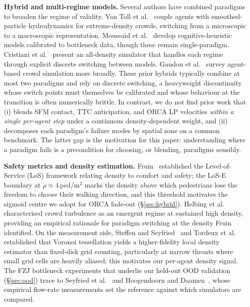 \documentclass[a4paper,twoside]{article}
\begin{document}
\textbf{Hybrid and multi-regime models.}
Several authors have combined paradigms to broaden the regime of validity. Van Toll et al.~\cite{VanToll21} couple agents with smoothed-particle hydrodynamics for extreme-density crowds, switching from a microscopic to a macroscopic representation. Moussa\"{\i}d et al.~\cite{Moussaid11} develop cognitive-heuristic models calibrated to bottleneck data, though these remain single-paradigm. Cristiani et al.~\cite{Cristiani23} present an all-density simulator that handles each regime through explicit discrete switching between models. Gaudou et al.~\cite{Gaudou24} survey agent-based crowd simulation more broadly. These prior hybrids typically combine at most two paradigms and rely on discrete switching, a heavyweight discontinuity whose switch points must themselves be calibrated and whose behaviour at the transition is often numerically brittle. In contrast, we do not find prior work that (i) blends SFM contact, TTC anticipation, and ORCA LP velocities \emph{within a single per-agent step} under a continuous density-dependent weight, and (ii) decomposes each paradigm's failure modes by spatial zone on a common benchmark. The latter gap is the motivation for this paper: understanding where a paradigm fails is a precondition for choosing, or blending, paradigms sensibly.

\textbf{Safety metrics and density estimation.}
Fruin~\cite{Fruin71} established the Level-of-Service (LoS) framework relating density to comfort and safety; the LoS-E boundary at $\rho\!\approx\!4$\,ped/m$^2$ marks the density above which pedestrians lose the freedom to choose their walking direction, and this threshold motivates the sigmoid centre we adopt for ORCA fade-out (\S\ref{sec:hybrid}). Helbing et al.~\cite{Helbing07} characterised crowd turbulence as an emergent regime at sustained high density, providing an empirical rationale for paradigm switching at the density Fruin identified. On the measurement side, Steffen and Seyfried~\cite{Steffen10} and Tordeux et al.~\cite{Tordeux15} established that Voronoi tessellation yields a higher-fidelity local density estimator than fixed-disk grid counting, particularly at narrow throats where small grid cells are heavily aliased; this motivates our per-agent density signal. The FZJ bottleneck experiments that underlie our held-out OOD validation (\S\ref{sec:ood}) trace to Seyfried et al.~\cite{Seyfried09} and Hoogendoorn and Daamen~\cite{Hoogendoorn05}, whose empirical flow-rate measurements set the reference against which simulators are compared.
\end{document}
